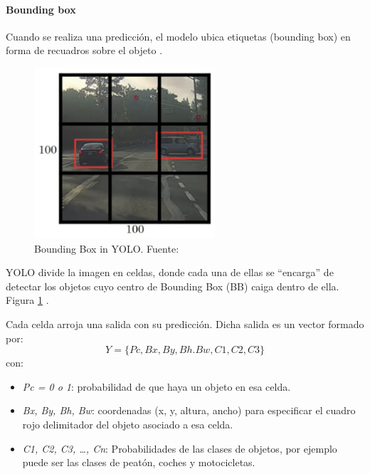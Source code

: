 \paragraph{Bounding box}
Cuando se realiza una predicción, el modelo ubica etiquetas (bounding box) en forma de recuadros sobre el objeto \cite{cnncourse}.

\begin{figure}[h!]
    \centering
    \includegraphics[width=0.6\textwidth]{img/bounding-box-yolo.png}
    \caption{Bounding Box in YOLO. Fuente:\cite{cnncourse}}
    \label{fig:bb in YOLO}
\end{figure}

YOLO divide la imagen en celdas, donde cada una de ellas se “encarga” de detectar los objetos cuyo centro de Bounding Box (BB) caiga dentro de ella. Figura \ref{fig:bb in YOLO} .

Cada celda arroja una salida con su predicción.
Dicha salida es un vector formado por: \[Y=\{Pc, Bx, By, Bh. Bw, C1, C2, C3\}\] con:
\begin{itemize}
    \item \textit{Pc = 0 o 1}: probabilidad de que haya un objeto en esa celda.
    \item \textit{Bx, By, Bh, Bw}: coordenadas (x, y, altura, ancho) para especificar el cuadro rojo delimitador del objeto asociado a esa celda.
    \item \textit{C1, C2, C3, …, Cn}: Probabilidades de las clases de objetos, por ejemplo puede ser las clases de peatón, coches y motocicletas.
\end{itemize}

